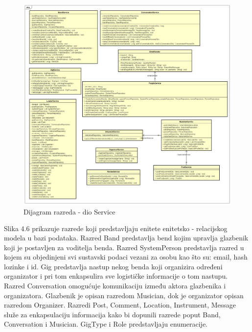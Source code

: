 		\begin{figure}[H]
			\begin{center}
				\includegraphics[width=16cm]{slike/service.PNG}
			\end{center}
			\caption{Dijagram razreda - dio Service}
			\label{fig:service}
		\end{figure}
	
	
	Slika 4.6 prikazuje razrede koji predstavljaju enitete enitetsko -  relacijskog modela u bazi podataka. Razred Band predstavlja bend kojim upravlja glazbenik koji je postavljen za voditelja benda. Razred SystemPerson predstavlja razred u kojem su objedinjeni svi sustavski podaci vezani za osobu kao što su: email, hash lozinke i id. Gig predstavlja  nastup nekog benda koji organizira određeni organizator i pri tom enkapsulira sve logističke informacije o tom nastupu. Razred Conversation omogućuje komunikaciju između aktora glazbenika i organizatora.
	Glazbenik je opisan razredom Musician, dok je organizator opisan razredom Organizer. Razredi Post, Comment, Location, Instrument, Message služe za enkapsulaciju informacija kako bi dopunili razrede poput Band, Conversation i Musician. GigType i Role predstavljaju enumeracije.
	
